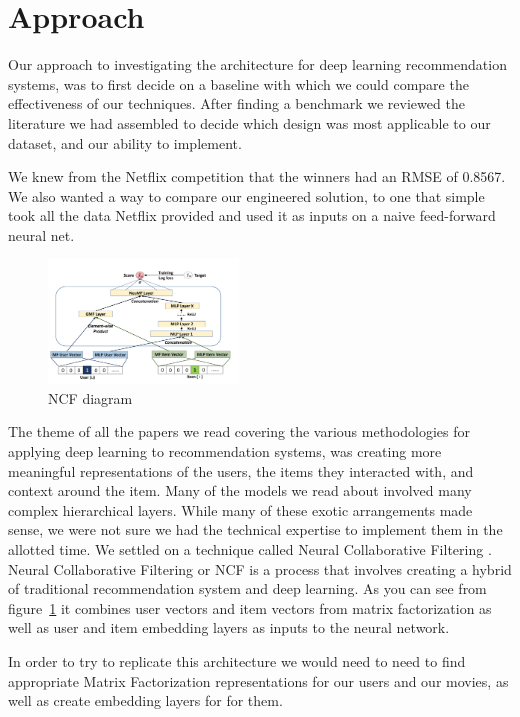 \section{Approach}
Our approach to investigating the architecture for deep learning recommendation systems, was to first decide on a baseline with which we could compare the effectiveness of our techniques. After finding a benchmark we reviewed the literature we had assembled to decide which design was most applicable to our dataset, and our ability to implement.

 We knew from the Netflix competition that the winners had an RMSE of 0.8567. We also wanted a way to compare our engineered solution, to one that simple took all the data Netflix provided and used it as inputs on a naive feed-forward neural net. 

 \begin{figure}[h]
    \centering
    \includegraphics[width=0.45\textwidth]{images/NCF_diagram.png}
    \caption{NCF diagram}
    \label{fig:NCF diagram}
\end{figure}

 The theme of all the papers we read covering the various methodologies for applying deep learning to recommendation systems, was creating more meaningful representations of the users, the items they interacted with, and context around the item. Many of the models we read about involved many complex hierarchical layers. While many of these exotic arrangements made sense, we were not sure we had the technical expertise to implement them in the allotted time. We settled on a technique called Neural Collaborative Filtering \cite{He2017}. Neural Collaborative Filtering or NCF is a process that involves creating a hybrid of traditional recommendation system and deep learning. As you can see from figure~\ref{fig:NCF diagram} it combines user vectors and item vectors from matrix factorization as well as user and item embedding layers as inputs to the neural network. 

 In order to try to replicate this architecture we would need to need to find appropriate Matrix Factorization representations for our users and our movies, as well as create embedding layers for for them. 


